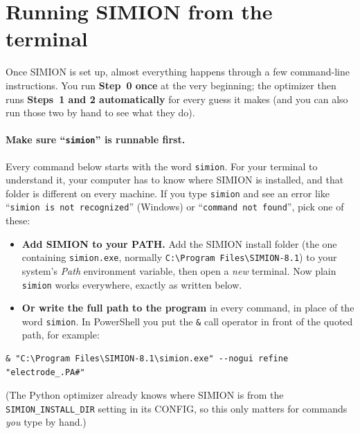 \documentclass[11pt]{article}
\begin{document}
\section{Running SIMION from the terminal}
\label{sec:terminal}

Once SIMION is set up, almost everything happens through a few command-line
instructions. You run \textbf{Step~0 once} at the very beginning; the optimizer
then runs \textbf{Steps~1 and 2 automatically} for every guess it makes (and you
can also run those two by hand to see what they do).

\paragraph{Make sure ``\texttt{simion}'' is runnable first.} Every command below
starts with the word \texttt{simion}. For your terminal to understand it, your
computer has to know where SIMION is installed, and that folder is different
on every machine. If you type \texttt{simion} and see an error like
``\texttt{simion is not recognized}'' (Windows) or ``\texttt{command not found}'',
pick one of these:
\begin{itemize}[nosep]
  \item \textbf{Add SIMION to your PATH.} Add the SIMION install folder (the one
        containing \texttt{simion.exe}, normally
        \texttt{C:\textbackslash\allowbreak Program Files\textbackslash\allowbreak SIMION-8.1}) to your
        system's \emph{Path} environment variable, then open a \emph{new}
        terminal. Now plain \texttt{simion} works everywhere, exactly as written
        below.
  \item \textbf{Or write the full path to the program} in every command, in
        place of the word \texttt{simion}. In PowerShell you put the \texttt{\&}
        call operator in front of the quoted path, for example:
\end{itemize}

\begin{lstlisting}[style=shell]
& "C:\Program Files\SIMION-8.1\simion.exe" --nogui refine "electrode_.PA#"
\end{lstlisting}

\noindent (The Python optimizer already knows where SIMION is from the
\texttt{SIMION\_INSTALL\_DIR} setting in its CONFIG, so this only matters for
commands \emph{you} type by hand.)
\end{document}
